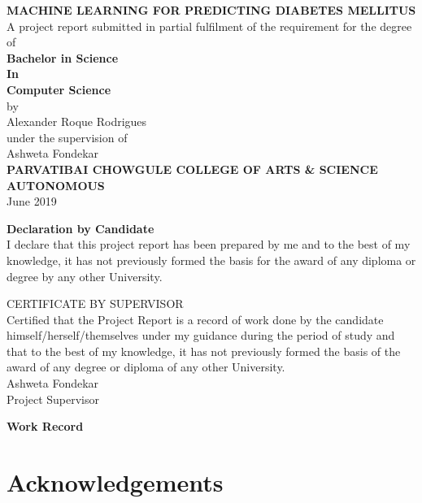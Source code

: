 \documentclass[12pt]{article}
\begin{document}
\begin{titlepage}
\newcommand{\HRule}{\rule{\linewidth}{0.5mm}} 
\center
\doublespacing
\textbf{\Huge MACHINE LEARNING FOR PREDICTING DIABETES MELLITUS}
\\
\singlespacing
\Large
\vspace{3cm}
A project report submitted in partial fulfilment of the requirement for the degree of\\
\vspace{1cm}
\textbf{Bachelor in Science\\In\\Computer Science}
\\by\\
\Large
Alexander Roque Rodrigues
\\
\vspace{1cm}
under the supervision of
\vspace{1cm}
\\
Ashweta Fondekar
\\
\textbf{PARVATIBAI CHOWGULE COLLEGE OF ARTS \& SCIENCE AUTONOMOUS}
\\June 2019
\end{titlepage}

\newpage
\vspace{5cm}
\begin{center}

\textbf{Declaration by Candidate}\\

I declare that this project report has been prepared by me and to the best of my
knowledge, it has not previously formed the basis for the award of any diploma or degree by
any other University.



\end{center}
\newpage
CERTIFICATE BY SUPERVISOR\\
Certified that the Project Report is a record of work done by the candidate
himself/herself/themselves under my guidance during the period of study and that to the
best of my knowledge, it has not previously formed the basis of the award of any degree or
diploma of any other University.\\

Ashweta Fondekar\\

Project Supervisor
\newpage

\textbf{Work Record}

\newpage
\section{Acknowledgements}
\end{document}
